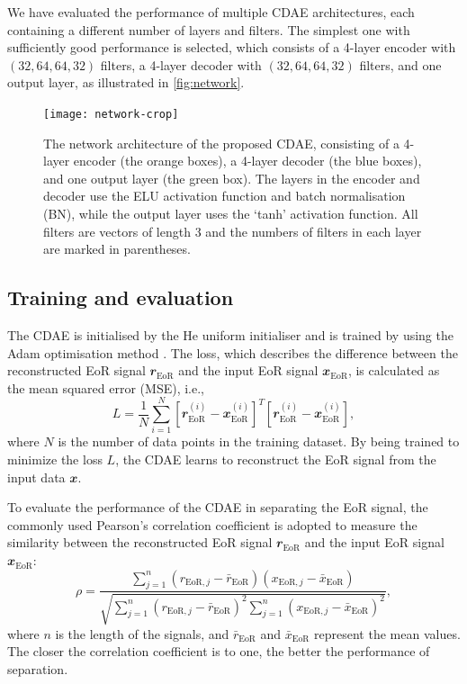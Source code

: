 \documentclass[letters,fleqn,usenatbib]{mnras}
\newcommand{\R}[1]{\mathrm{#1}}
\newcommand{\B}[1]{\mathbfit{#1}}
\begin{document}
We have evaluated the performance of multiple CDAE architectures, each
containing a different number of layers and filters.
The simplest one with sufficiently good performance is selected,
which consists of a 4-layer encoder with $(32,64,64,32)$ filters,
a 4-layer decoder with $(32,64,64,32)$ filters, and one output layer,
as illustrated in \autoref{fig:network}.

\begin{figure}
  \centering
  \texttt{[image: network-crop]}
  \caption{\label{fig:network}%
    The network architecture of the proposed CDAE, consisting of a
    4-layer encoder (the orange boxes), a 4-layer decoder (the blue
    boxes), and one output layer (the green box).
    The layers in the encoder and decoder use the ELU activation
    function and batch normalisation (BN), while the output layer uses
    the `tanh' activation function.
    All filters are vectors of length 3 and the numbers of filters in
    each layer are marked in parentheses.
  }
\end{figure}


\subsection{Training and evaluation}
\label{sec:train-eval}

The CDAE is initialised by the He uniform initialiser \citep{he2015}
and is trained by using the Adam optimisation method \citep{kingma2015}.
The loss, which describes the difference between the reconstructed EoR
signal $\B{r}_{\R{EoR}}$ and the input EoR signal $\B{x}_{\R{EoR}}$,
is calculated as the mean squared error (MSE), i.e.,
\begin{equation}
  \label{eq:loss}
  L = \frac{1}{N} \sum_{i=1}^{N}
    \left[ \B{r}_{\R{EoR}}^{(i)} - \B{x}_{\R{EoR}}^{(i)} \right]^T
    \left[ \B{r}_{\R{EoR}}^{(i)} - \B{x}_{\R{EoR}}^{(i)} \right],
\end{equation}
where $N$ is the number of data points in the training dataset.
By being trained to minimize the loss $L$, the CDAE learns to
reconstruct the EoR signal from the input data $\B{x}$.

To evaluate the performance of the CDAE in separating the EoR signal,
the commonly used Pearson's correlation coefficient
\citep[e.g.,][]{harker2009,chapman2013}
is adopted to measure the similarity between the reconstructed EoR
signal $\B{r}_{\R{EoR}}$ and the input EoR signal $\B{x}_{\R{EoR}}$:
\begin{equation}
  \label{eq:corrcoef}
  \rho = \frac{\sum_{j=1}^{n}(r_{\R{EoR},j} - \bar{r}_{\R{EoR}})
      (x_{\R{EoR},j} - \bar{x}_{\R{EoR}})}{
        \sqrt{\sum_{j=1}^{n}(r_{\R{EoR},j} - \bar{r}_{\R{EoR}})^2
          \sum_{j=1}^{n}(x_{\R{EoR},j} - \bar{x}_{\R{EoR}})^2}
    },
\end{equation}
where $n$ is the length of the signals,
and $\bar{r}_{\R{EoR}}$ and $\bar{x}_{\R{EoR}}$ represent the mean values.
The closer the correlation coefficient is to one, the better the
performance of separation.
\end{document}
